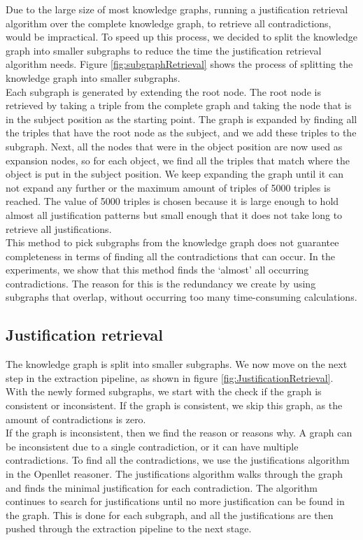 \documentclass[11pt,letterpaper ,oneside ]{book}
\begin{document}
	Due to the large size of most knowledge graphs, running a justification retrieval algorithm over the complete knowledge graph, to retrieve all contradictions, would be impractical. To speed up this process, we decided to split the knowledge graph into smaller subgraphs to reduce the time the justification retrieval algorithm needs. Figure \ref{fig:subgraphRetrieval} shows the process of splitting the knowledge graph into smaller subgraphs.\\
	Each subgraph is generated by extending the root node. The root node is retrieved by taking a triple from the complete graph and taking the node that is in the subject position as the starting point. The graph is expanded by finding all the triples that have the root node as the subject, and we add these triples to the subgraph. Next, all the nodes that were in the object position are now used as expansion nodes, so for each object, we find all the triples that match where the object is put in the subject position. We keep expanding the graph until it can not expand any further or the maximum amount of triples of 5000 triples is reached. The value of 5000 triples is chosen because it is large enough to hold almost all justification patterns but small enough that it does not take long to retrieve all justifications.\\
	This method to pick subgraphs from the knowledge graph does not guarantee completeness in terms of finding all the contradictions that can occur. In the experiments, we show that this method finds the `almost' all occurring contradictions. The reason for this is the redundancy we create by using subgraphs that overlap, without occurring too many time-consuming calculations. 
	
	\subsection{Justification retrieval}
	The knowledge graph is split into smaller subgraphs. We now move on the next step in the extraction pipeline, as shown in figure \ref{fig:JustificationRetrieval}.
	With the newly formed subgraphs, we start with the check if the graph is consistent or inconsistent. If the graph is consistent, we skip this graph, as the amount of contradictions is zero.\\ 
	If the graph is inconsistent, then we find the reason or reasons why. A graph can be inconsistent due to a single contradiction, or it can have multiple contradictions. 
	To find all the contradictions, we use the justifications algorithm in the Openllet reasoner. The justifications algorithm walks through the graph and finds the minimal justification for each contradiction. The algorithm continues to search for justifications until no more justification can be found in the graph. This is done for each subgraph, and all the justifications are then pushed through the extraction pipeline to the next stage.\\
	
\end{document}
